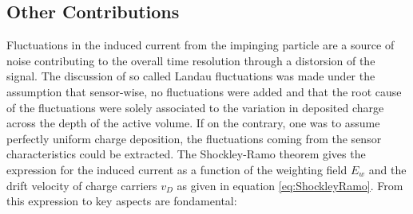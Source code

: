 		\subsection{Other Contributions}
		Fluctuations in the induced current from the impinging particle are a source of noise contributing to the overall time resolution through a distorsion of the signal. The discussion of so called Landau fluctuations was made under the assumption that sensor-wise, no fluctuations were added and that the root cause of the fluctuations were solely associated to the variation in deposited charge across the depth of the active volume. If on the contrary, one was to assume perfectly uniform charge deposition, the fluctuations coming from the sensor characteristics could be extracted. The Shockley-Ramo theorem gives the expression for the induced current as a function of the weighting field $E_w$ and the drift velocity of charge carriers $v_D$ as given in equation \ref{eq:ShockleyRamo}. From this expression to key aspects are fondamental: 
